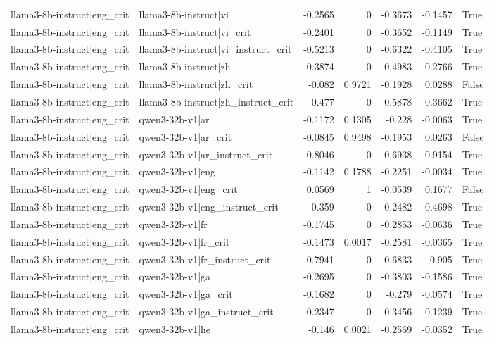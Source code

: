 \begin{table}
\begin{tabular}{l l r r r r l}
llama3-8b-instruct|eng_crit & llama3-8b-instruct|vi & -0.2565 & 0 & -0.3673 & -0.1457 & True \\
llama3-8b-instruct|eng_crit & llama3-8b-instruct|vi_crit & -0.2401 & 0 & -0.3652 & -0.1149 & True \\
llama3-8b-instruct|eng_crit & llama3-8b-instruct|vi_instruct_crit & -0.5213 & 0 & -0.6322 & -0.4105 & True \\
llama3-8b-instruct|eng_crit & llama3-8b-instruct|zh & -0.3874 & 0 & -0.4983 & -0.2766 & True \\
llama3-8b-instruct|eng_crit & llama3-8b-instruct|zh_crit & -0.082 & 0.9721 & -0.1928 & 0.0288 & False \\
llama3-8b-instruct|eng_crit & llama3-8b-instruct|zh_instruct_crit & -0.477 & 0 & -0.5878 & -0.3662 & True \\
llama3-8b-instruct|eng_crit & qwen3-32b-v1|ar & -0.1172 & 0.1305 & -0.228 & -0.0063 & True \\
llama3-8b-instruct|eng_crit & qwen3-32b-v1|ar_crit & -0.0845 & 0.9498 & -0.1953 & 0.0263 & False \\
llama3-8b-instruct|eng_crit & qwen3-32b-v1|ar_instruct_crit & 0.8046 & 0 & 0.6938 & 0.9154 & True \\
llama3-8b-instruct|eng_crit & qwen3-32b-v1|eng & -0.1142 & 0.1788 & -0.2251 & -0.0034 & True \\
llama3-8b-instruct|eng_crit & qwen3-32b-v1|eng_crit & 0.0569 & 1 & -0.0539 & 0.1677 & False \\
llama3-8b-instruct|eng_crit & qwen3-32b-v1|eng_instruct_crit & 0.359 & 0 & 0.2482 & 0.4698 & True \\
llama3-8b-instruct|eng_crit & qwen3-32b-v1|fr & -0.1745 & 0 & -0.2853 & -0.0636 & True \\
llama3-8b-instruct|eng_crit & qwen3-32b-v1|fr_crit & -0.1473 & 0.0017 & -0.2581 & -0.0365 & True \\
llama3-8b-instruct|eng_crit & qwen3-32b-v1|fr_instruct_crit & 0.7941 & 0 & 0.6833 & 0.905 & True \\
llama3-8b-instruct|eng_crit & qwen3-32b-v1|ga & -0.2695 & 0 & -0.3803 & -0.1586 & True \\
llama3-8b-instruct|eng_crit & qwen3-32b-v1|ga_crit & -0.1682 & 0 & -0.279 & -0.0574 & True \\
llama3-8b-instruct|eng_crit & qwen3-32b-v1|ga_instruct_crit & -0.2347 & 0 & -0.3456 & -0.1239 & True \\
llama3-8b-instruct|eng_crit & qwen3-32b-v1|he & -0.146 & 0.0021 & -0.2569 & -0.0352 & True \\

\end{tabular}
\end{table}
